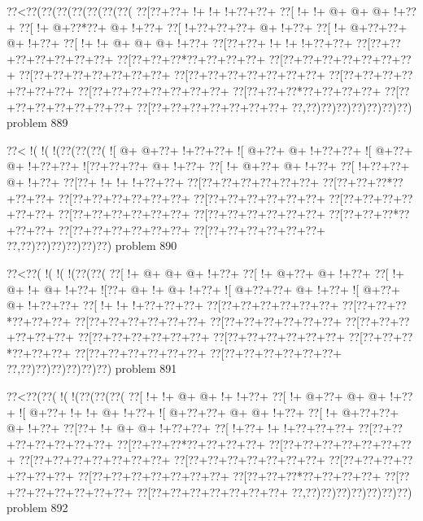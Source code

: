 \vbox{\vbox{\goo
\0??<\0??(\0??(\0??(\0??(\0??(\0??(\0??(
\0??[\0??+\0??+\- !+\- !+\- !+\0??+\0??+
\0??[\- !+\- !+\- @+\- @+\- @+\- !+\0??+
\0??[\- !+\- @+\0??*\0??+\- @+\- !+\0??+
\0??[\- !+\0??+\0??+\0??+\- @+\- !+\0??+
\0??[\- !+\- @+\0??+\0??+\- @+\- !+\0??+
\0??[\- !+\- !+\- @+\- @+\- @+\- !+\0??+
\0??[\0??+\0??+\- !+\- !+\- !+\0??+\0??+
\0??[\0??+\0??+\0??+\0??+\0??+\0??+\0??+
\0??[\0??+\0??+\0??*\0??+\0??+\0??+\0??+
\0??[\0??+\0??+\0??+\0??+\0??+\0??+\0??+
\0??[\0??+\0??+\0??+\0??+\0??+\0??+\0??+
\0??[\0??+\0??+\0??+\0??+\0??+\0??+\0??+
\0??[\0??+\0??+\0??+\0??+\0??+\0??+\0??+
\0??[\0??+\0??+\0??+\0??+\0??+\0??+\0??+
\0??[\0??+\0??+\0??*\0??+\0??+\0??+\0??+
\0??[\0??+\0??+\0??+\0??+\0??+\0??+\0??+
\0??[\0??+\0??+\0??+\0??+\0??+\0??+\0??+
\0??,\0??)\0??)\0??)\0??)\0??)\0??)\0??)
}
\hfil problem 889\hfil\break
}

\vbox{\vbox{\goo
\0??<\- !(\- !(\- !(\0??(\0??(\0??(
\- ![\- @+\- @+\0??+\- !+\0??+\0??+
\- ![\- @+\0??+\- @+\- !+\0??+\0??+
\- ![\- @+\0??+\- @+\- !+\0??+\0??+
\- ![\0??+\0??+\0??+\- @+\- !+\0??+
\0??[\- !+\- @+\0??+\- @+\- !+\0??+
\0??[\- !+\0??+\0??+\- @+\- !+\0??+
\0??[\0??+\- !+\- !+\- !+\0??+\0??+
\0??[\0??+\0??+\0??+\0??+\0??+\0??+
\0??[\0??+\0??+\0??*\0??+\0??+\0??+
\0??[\0??+\0??+\0??+\0??+\0??+\0??+
\0??[\0??+\0??+\0??+\0??+\0??+\0??+
\0??[\0??+\0??+\0??+\0??+\0??+\0??+
\0??[\0??+\0??+\0??+\0??+\0??+\0??+
\0??[\0??+\0??+\0??+\0??+\0??+\0??+
\0??[\0??+\0??+\0??*\0??+\0??+\0??+
\0??[\0??+\0??+\0??+\0??+\0??+\0??+
\0??[\0??+\0??+\0??+\0??+\0??+\0??+
\0??,\0??)\0??)\0??)\0??)\0??)\0??)
}
\hfil problem 890\hfil\break
}

\vbox{\vbox{\goo
\0??<\0??(\- !(\- !(\- !(\0??(\0??(
\0??[\- !+\- @+\- @+\- @+\- !+\0??+
\0??[\- !+\- @+\0??+\- @+\- !+\0??+
\0??[\- !+\- @+\- !+\- @+\- !+\0??+
\- ![\0??+\- @+\- !+\- @+\- !+\0??+
\- ![\- @+\0??+\0??+\- @+\- !+\0??+
\- ![\- @+\0??+\- @+\- !+\0??+\0??+
\0??[\- !+\- !+\- !+\0??+\0??+\0??+
\0??[\0??+\0??+\0??+\0??+\0??+\0??+
\0??[\0??+\0??+\0??*\0??+\0??+\0??+
\0??[\0??+\0??+\0??+\0??+\0??+\0??+
\0??[\0??+\0??+\0??+\0??+\0??+\0??+
\0??[\0??+\0??+\0??+\0??+\0??+\0??+
\0??[\0??+\0??+\0??+\0??+\0??+\0??+
\0??[\0??+\0??+\0??+\0??+\0??+\0??+
\0??[\0??+\0??+\0??*\0??+\0??+\0??+
\0??[\0??+\0??+\0??+\0??+\0??+\0??+
\0??[\0??+\0??+\0??+\0??+\0??+\0??+
\0??,\0??)\0??)\0??)\0??)\0??)\0??)
}
\hfil problem 891\hfil\break
}

\vbox{\vbox{\goo
\0??<\0??(\0??(\- !(\- !(\0??(\0??(\0??(
\0??[\- !+\- !+\- @+\- @+\- !+\- !+\0??+
\0??[\- !+\- @+\0??+\- @+\- @+\- !+\0??+
\- ![\- @+\0??+\- !+\- !+\- @+\- !+\0??+
\- ![\- @+\0??+\0??+\- @+\- @+\- !+\0??+
\0??[\- !+\- @+\0??+\0??+\- @+\- !+\0??+
\0??[\0??+\- !+\- @+\- @+\- !+\0??+\0??+
\0??[\- !+\0??+\- !+\- !+\0??+\0??+\0??+
\0??[\0??+\0??+\0??+\0??+\0??+\0??+\0??+
\0??[\0??+\0??+\0??*\0??+\0??+\0??+\0??+
\0??[\0??+\0??+\0??+\0??+\0??+\0??+\0??+
\0??[\0??+\0??+\0??+\0??+\0??+\0??+\0??+
\0??[\0??+\0??+\0??+\0??+\0??+\0??+\0??+
\0??[\0??+\0??+\0??+\0??+\0??+\0??+\0??+
\0??[\0??+\0??+\0??+\0??+\0??+\0??+\0??+
\0??[\0??+\0??+\0??*\0??+\0??+\0??+\0??+
\0??[\0??+\0??+\0??+\0??+\0??+\0??+\0??+
\0??[\0??+\0??+\0??+\0??+\0??+\0??+\0??+
\0??,\0??)\0??)\0??)\0??)\0??)\0??)\0??)
}
\hfil problem 892\hfil\break
}

